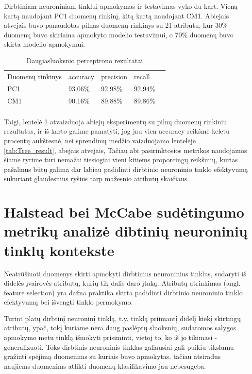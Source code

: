 \documentclass{VUMIFPSbakalaurinis}
\begin{document}
Dirbtiniam neuroniniam tinklui apmokymas ir testavimas vyko du kart. Vieną kartą naudojant PC1 duomenų rinkinį, kitą kartą naudojant CM1. Abiejais atvejais buvo panaudotas pilnas duomenų rinkinys su 21 atributu, kur 30\% duomenų buvo skiriama apmokyto modelio testavimui, o 70\% duomenų buvo skirta modelio apmokymui.

\begin{table}[H]\footnotesize
\centering
\caption{Daugiasluoksnio perceptrono rezultatai}
\label{tab:MLP_result}
\begin{tabular}{lllll}
\cline{1-4}
\multicolumn{1}{|l}{Duomenų rinkinys} & accuracy & precision & \multicolumn{1}{l|}{recall} &  \\ \cline{1-4}
\multicolumn{1}{|l}{PC1}              & 93.06\%   & 92.98\%     & \multicolumn{1}{l|}{92.94\%} &  \\
\multicolumn{1}{|l}{CM1}              & 90.16\%    & 89.88\%     & \multicolumn{1}{l|}{89.86\%}  &  \\ \cline{1-4}
                                      &          &           &                             & 
\end{tabular}
\end{table}

Taigi, lentelė \ref{tab:MLP_result} atvaizduoja abiejų eksperimentų su pilnų duomenų rinkiniu rezultatus, ir iš karto galime pamatyti, jog jau vien accuracy reikšmė keletu procentų aukštesnė, nei sprendimų medžio vaizduojamo lentelėje \ref{tab:Tree_result}, abejais atvejais, Tačiau abi pasirinktosios metrikos naudojamos šiame tyrime turi nemažai tiesiogiai vieni kitiems proporcingų reikšmių, kurias pašalinus būtų galima dar labiau padidinti dirbtinio neuroninio tinklo efektyvumą sukuriant glaudesnius ryšius tarp mažesnio atributų skaičiaus.

\section{Halstead bei McCabe sudėtingumo metrikų analizė dibtinių neuroninių tinklų kontekste}

Neatrūšiuoti duomenys skirti apmokyti dirbtinius neuroninius tinklus, sudaryti iš didelės įvairovės atributų, kurių tik dalis daro įtaką. Atributų atrinkimas (angl. feature selection) yra dažna praktika skirta padidinti dirbtinio neuroninio tinklo efektyvumą bei išvengti tinklo permokymo.

Turint platų dirbtinį neuroninį tinklą, t.y. tinklą priimantį didelį kiekį skirtingų atributų, ypač, tokį kuriame nėra daug paslėptų sluoksnių, sudaromos salygos apmokymo metu tinklą išmokyti prisiminti, vietoj to, ko iš jo tikimasi - generalizuoti. Toks dirbtinis neuroninis tinklas galiausiai gali puikiu tikslumu grąžinti spėjimą duomenims su kuriais buvo apmokytas, tačiau atsiradus naujiems duomenims atlikti duomenų klasifikavimo jau nebesugeba.
\end{document}
